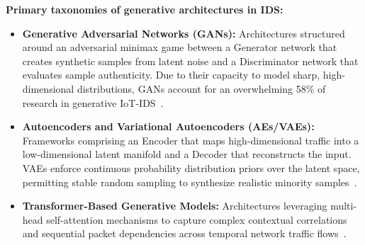 \noindent\textbf{Primary taxonomies of generative architectures in IDS:}
\begin{itemize}
    \item \textbf{Generative Adversarial Networks (GANs):} Architectures structured around an adversarial minimax game between a Generator network that creates synthetic samples from latent noise and a Discriminator network that evaluates sample authenticity. Due to their capacity to model sharp, high-dimensional distributions, GANs account for an overwhelming 58\% of research in generative IoT-IDS~\cite{deng2025}.
    \item \textbf{Autoencoders and Variational Autoencoders (AEs/VAEs):} Frameworks comprising an Encoder that maps high-dimensional traffic into a low-dimensional latent manifold and a Decoder that reconstructs the input. VAEs enforce continuous probability distribution priors over the latent space, permitting stable random sampling to synthesize realistic minority samples~\cite{deng2025}.
    \item \textbf{Transformer-Based Generative Models:} Architectures leveraging multi-head self-attention mechanisms to capture complex contextual correlations and sequential packet dependencies across temporal network traffic flows~\cite{deng2025}.
\end{itemize}

